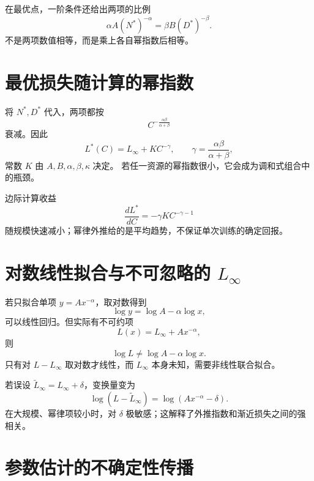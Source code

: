 \documentclass[11pt]{article}
\numberwithin{equation}{section}
\newcommand{\1}{\mathbf{1}}
\begin{document}
在最优点，一阶条件还给出两项的比例
\begin{equation}
 \alpha A(N^*)^{-\alpha}=\beta B(D^*)^{-\beta}.
\end{equation}
不是两项数值相等，而是乘上各自幂指数后相等。

\section{最优损失随计算的幂指数}

将 $N^*,D^*$ 代入，两项都按
\begin{equation}
 C^{-\frac{\alpha\beta}{\alpha+\beta}}
\end{equation}
衰减。因此
\begin{equation}
 L^*(C)=L_\infty+K C^{-\gamma},
 \qquad \gamma=\frac{\alpha\beta}{\alpha+\beta},
\end{equation}
常数 $K$ 由 $A,B,\alpha,\beta,\kappa$ 决定。
若任一资源的幂指数很小，它会成为调和式组合中的瓶颈。

边际计算收益
\begin{equation}
 \frac{dL^*}{dC}=-\gamma K C^{-\gamma-1}
\end{equation}
随规模快速减小；幂律外推给的是平均趋势，不保证单次训练的确定回报。

\section{对数线性拟合与不可忽略的 $L_\infty$}

若只拟合单项 $y=A x^{-\alpha}$，取对数得到
\begin{equation}
 \log y=\log A-\alpha\log x,
\end{equation}
可以线性回归。但实际有不可约项
\begin{equation}
 L(x)=L_\infty+A x^{-\alpha},
\end{equation}
则
\begin{equation}
 \log L\ne\log A-\alpha\log x.
\end{equation}
只有对 $L-L_\infty$ 取对数才线性，而 $L_\infty$ 本身未知，需要非线性联合拟合。

若误设 $\widetilde L_\infty=L_\infty+\delta$，变换量变为
\begin{equation}
 \log(L-\widetilde L_\infty)
 =\log(Ax^{-\alpha}-\delta).
\end{equation}
在大规模、幂律项较小时，对 $\delta$ 极敏感；这解释了外推指数和渐近损失之间的强相关。

\section{参数估计的不确定性传播}
\end{document}
